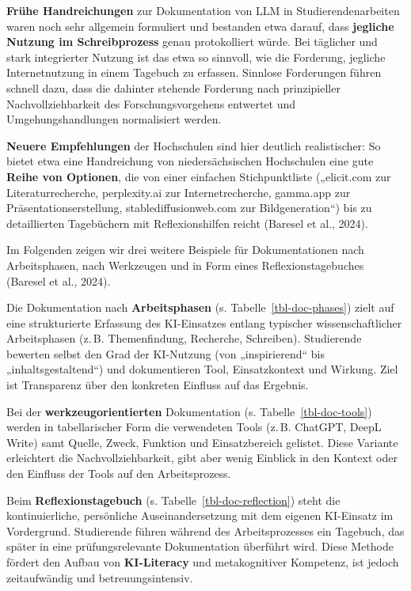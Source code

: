 \documentclass[
  ngerman,
  letterpaper,
  DIV=11]{scrreprt}
\begin{document}
\textbf{Frühe Handreichungen} zur Dokumentation von LLM in
Studierendenarbeiten waren noch sehr allgemein formuliert und bestanden
etwa darauf, dass \textbf{jegliche Nutzung im Schreibprozess} genau
protokolliert würde. Bei täglicher und stark integrierter Nutzung ist
das etwa so sinnvoll, wie die Forderung, jegliche Internetnutzung in
einem Tagebuch zu erfassen. Sinnlose Forderungen führen schnell dazu,
dass die dahinter stehende Forderung nach prinzipieller
Nachvollziehbarkeit des Forschungsvorgehens entwertet und
Umgehungshandlungen normalisiert werden.

\textbf{Neuere Empfehlungen} der Hochschulen sind hier deutlich
realistischer: So bietet etwa eine Handreichung von niedersächsischen
Hochschulen eine gute \textbf{Reihe von Optionen}, die von einer
einfachen Stichpunktliste („elicit.com zur Literaturrecherche,
perplexity.ai zur Internetrecherche, gamma.app zur
Präsentationserstellung, stablediffusionweb.com zur Bildgeneration``)
bis zu detaillierten Tagebüchern mit Reflexionshilfen reicht (Baresel et
al., 2024).

Im Folgenden zeigen wir drei weitere Beispiele für Dokumentationen nach
Arbeitsphasen, nach Werkzeugen und in Form eines Reflexionstagebuches
(Baresel et al., 2024).

Die Dokumentation nach \textbf{Arbeitsphasen} (s.
Tabelle~\ref{tbl-doc-phases}) zielt auf eine strukturierte Erfassung des
KI-Einsatzes entlang typischer wissenschaftlicher Arbeitsphasen (z.\,B.
Themenfindung, Recherche, Schreiben). Studierende bewerten selbst den
Grad der KI-Nutzung (von „inspirierend`` bis „inhaltsgestaltend``) und
dokumentieren Tool, Einsatzkontext und Wirkung. Ziel ist Transparenz
über den konkreten Einfluss auf das Ergebnis.

Bei der \textbf{werkzeugorientierten} Dokumentation (s.
Tabelle~\ref{tbl-doc-tools}) werden in tabellarischer Form die
verwendeten Tools (z.\,B. ChatGPT, DeepL Write) samt Quelle, Zweck,
Funktion und Einsatzbereich gelistet. Diese Variante erleichtert die
Nachvollziehbarkeit, gibt aber wenig Einblick in den Kontext oder den
Einfluss der Tools auf den Arbeitsprozess.

Beim \textbf{Reflexionstagebuch} (s. Tabelle~\ref{tbl-doc-reflection})
steht die kontinuierliche, persönliche Auseinandersetzung mit dem
eigenen KI-Einsatz im Vordergrund. Studierende führen während des
Arbeitsprozesses ein Tagebuch, das später in eine prüfungsrelevante
Dokumentation überführt wird. Diese Methode fördert den Aufbau von
\textbf{KI-Literacy} und metakognitiver Kompetenz, ist jedoch
zeitaufwändig und betreuungsintensiv.
\end{document}
